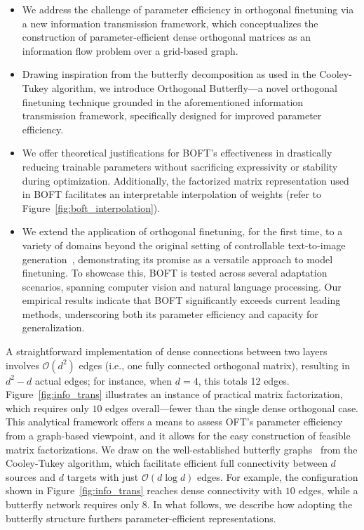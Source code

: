 \begin{itemize}[leftmargin=*,nosep]
    \item We address the challenge of parameter efficiency in orthogonal finetuning via a new information transmission framework, which conceptualizes the construction of parameter-efficient dense orthogonal matrices as an information flow problem over a grid-based graph.
    \item Drawing inspiration from the butterfly decomposition as used in the Cooley-Tukey algorithm, we introduce Orthogonal Butterfly—a novel orthogonal finetuning technique grounded in the aforementioned information transmission framework, specifically designed for improved parameter efficiency.
    \item We offer theoretical justifications for BOFT’s effectiveness in drastically reducing trainable parameters without sacrificing expressivity or stability during optimization. Additionally, the factorized matrix representation used in BOFT facilitates an interpretable interpolation of weights (refer to Figure~\ref{fig:boft_interpolation}).
    \item We extend the application of orthogonal finetuning, for the first time, to a variety of domains beyond the original setting of controllable text-to-image generation~\cite{qiu2023controlling}, demonstrating its promise as a versatile approach to model finetuning. To showcase this, BOFT is tested across several adaptation scenarios, spanning computer vision and natural language processing. Our empirical results indicate that BOFT significantly exceeds current leading methods, underscoring both its parameter efficiency and capacity for generalization.
\end{itemize}

A straightforward implementation of dense connections between two layers involves $\mathcal{O}(d^2)$ edges (i.e., one fully connected orthogonal matrix), resulting in $d^2 - d$ actual edges; for instance, when $d=4$, this totals 12 edges. Figure~\ref{fig:info_trans} illustrates an instance of practical matrix factorization, which requires only $10$ edges overall—fewer than the single dense orthogonal case. This analytical framework offers a means to assess OFT's parameter efficiency from a graph-based viewpoint, and it allows for the easy construction of feasible matrix factorizations. We draw on the well-established butterfly graphs~\cite{cooley1965algorithm} from the Cooley-Tukey algorithm, which facilitate efficient full connectivity between $d$ sources and $d$ targets with just $\mathcal{O}(d \log d)$ edges. For example, the configuration shown in Figure~\ref{fig:info_trans} reaches dense connectivity with $10$ edges, while a butterfly network requires only $8$. In what follows, we describe how adopting the butterfly structure furthers parameter-efficient representations.

